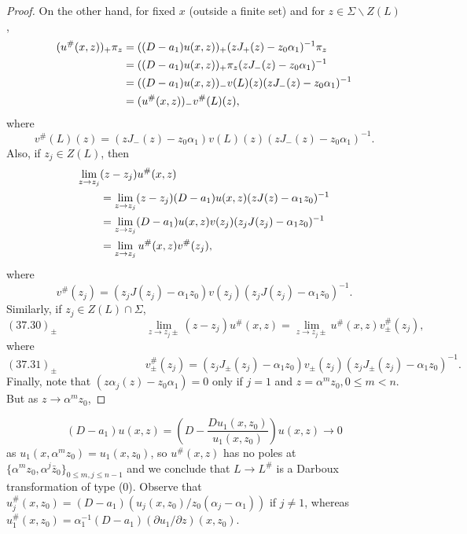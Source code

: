 \documentclass{surv-l}
\theoremstyle{plain}
\theoremstyle{definition}
\numberwithin{equation}{chapter}
\begin{document}
\begin{proof}
On the other hand, for fixed $x$ (outside a finite set) and for $z\in\Sigma\backslash Z(L)$,
\begin{align}\label{eq37.26}
(u^{\#}(x, z))_{+}\pi_{z}&=((D-a_{1})u(x, z))_{+}(zJ_{+}(z)-z_{0}\alpha_{1})^{-1}\pi_{z}\\
&=((D-a_{1})u(x, z))_{+}\pi_{z}(zJ_{-}(z)-z_{0}\alpha_{1})^{-1}\notag\\
&=((D-a_{1})u(x, z))_{-}v(L)(z)(zJ_{-}(z)-z_{0}\alpha_{1})^{-1}\notag\\
&=(u^{\#}(x, z))_{-}v^{\#}(L)(z),\notag
\end{align}
where
\begin{equation}\label{eq37.27}
v^{\#}(L)(z)=(zJ_{-}(z)-z_{0}\alpha_{1})v(L)(z)(zJ_{-}(z)-z_{0}\alpha_{1})^{-1}.
\end{equation}
Also, if $z_{j}\in Z(L)$, then
\begin{align}\label{eq37.28}
\lim_{z\rightarrow z_{j}}&(z-z_{j})u^{\#}(x,z)\\
&=\lim_{z\rightarrow z_{j}}(z-z_{j})(D-a_{1})u(x, z)(zJ(z)-\alpha_{1}z_{0})^{-1}\notag\\
&=\lim_{z\rightarrow z_{j}}(D-a_{1})u(x, z)v(z_{j})(z_{j}J(z_{j})-\alpha_{1}z_{0})^{-1}\notag\\
&=\lim_{z\rightarrow z_{j}}u^{\#}(x, z)v^{\#}(z_{j}),\notag
\end{align}
where
\begin{equation}\label{eq37.29}
v^{\#}(z_{j})=(z_{j}J(z_{j})-\alpha_{1}z_{0})v(z_{j})(z_{j}J(z_{j})-\alpha_{1}z_{0})^{-1}.
\end{equation}
Similarly, if $z_{j}\in Z(L)\cap\Sigma$,
\begin{equation*}
(37.30)_{\pm}\qquad\qquad\qquad\qquad\lim_{z\rightarrow z_{j}\pm}(z-z_{j})u^{\#}(x, z)=\lim_{z\rightarrow z_{j}\pm}u^{\#}(x, z)v_{\pm}^{\#}(z_{j}),
\end{equation*}
where
\begin{equation*}
(37.31)_{\pm}\qquad\qquad\qquad\qquad v_{\pm}^{\#}(z_{j})=(z_{j}J_{\pm}(z_{j})-\alpha_{1}z_{0})v_{\pm}(z_{j})(z_{j}J_{\pm}(z_{j})-\alpha_{1}z_{0})^{-1}.
\end{equation*}
Finally, note that $(z\alpha_{j}(z) -z_{0}\alpha_{1})=0$ only if $j=1$ and $z=\alpha^{m}z_{0},0\leq m<n$. But as $z \rightarrow\alpha^{m}z_{0}$,
\end{proof}
\begin{equation*}
(D-a_{1})u(x,z)=\left(D-\frac{Du_{1}(x,z_{0})}{u_{1}(x,z_{0})}\right)u(x, z)\rightarrow 0
\end{equation*}
as $u_{1}(x, \alpha^{m}z_{0})=u_{1}(x, z_{0})$, so $ u^{\#} (x,z)$ has no poles at $\{\alpha^{m}z_{0}, \alpha^{j}\bar{z}_{0}\}_{0\leq m,j\leq n-1}$ and we conclude that $L\rightarrow L^{\#}$ is a Darboux transformation of type (0). Observe that $u_{j}^{\#}(x, z_{0})=(D-a_{1})(u_{j}(x, z_{0})/z_{0}(\alpha_{j}-\alpha_{1}))$ if $j\neq 1$, whereas $u_{1}^{\#}(x, z_{0})= \alpha_{1}^{-1}(D-a_{1})(\partial u_{1}/\partial z)(x,z_{0})$.
\end{document}
